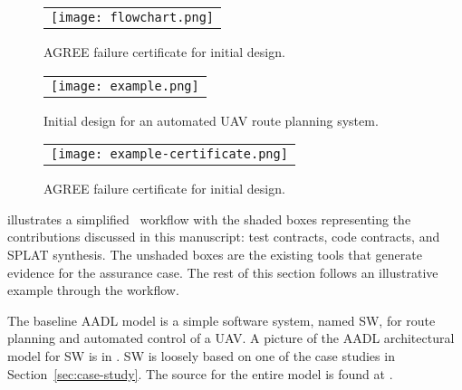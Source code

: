 \begin{figure*}
  \begin{center}
    \begin{tabular}{c}
      \texttt{[image: flowchart.png]} \\
    \end{tabular}
  \end{center}
\caption{AGREE failure certificate for initial design.}
\label{fig:flowchart}
\end{figure*}

\begin{figure*}[h]
  \begin{center}
    \begin{tabular}{c}
      \texttt{[image: example.png]}
    \end{tabular}
  \end{center}
\caption{Initial design for an automated UAV route planning system.}
\label{fig:example}
\end{figure*}

\begin{figure}
  \begin{center}
    \begin{tabular}{c}
      \texttt{[image: example-certificate.png]} \\
    \end{tabular}
  \end{center}
\caption{AGREE failure certificate for initial design.}
\label{fig:example-certificate}
\end{figure}


 illustrates a simplified \brfcs\ workflow with the shaded boxes representing the contributions discussed in this manuscript: test contracts, code contracts, and SPLAT synthesis.
The unshaded boxes are the existing tools that generate evidence for the assurance case.
The rest of this section follows an illustrative example through the workflow.

The baseline AADL model is a simple software system, named SW, for route planning
and automated control of a UAV. A picture of the AADL architectural
model for SW is in . SW is loosely based on one of
the case studies in Section~\ref{sec:case-study}.  The source for the
entire model is found at \cite{repo}.

